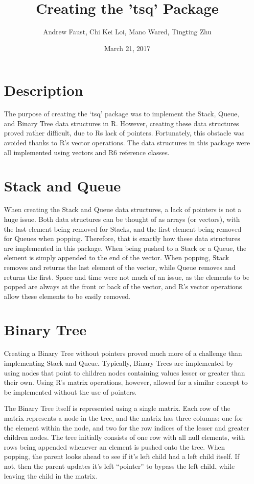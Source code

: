 \documentclass[12pt,letterpaper]{article}
\begin{document}
\title{Creating the 'tsq' Package}
\date{March 21, 2017}
\author{Andrew Faust, Chi Kei Loi, Mano Wared, Tingting Zhu}
\maketitle

\section{Description}
The purpose of creating the ‘tsq’ package was to implement the Stack, Queue,
and Binary Tree data structures in R. However, creating these data structures
proved rather difficult, due to Rs lack of pointers. Fortunately, this obstacle
was avoided thanks to R’s vector operations. The data structures in this
package were all implemented using vectors and R6 reference classes.

\section{Stack and Queue}
When creating the Stack and Queue data structures, a lack of pointers is not a
huge issue. Both data structures can be thought of as arrays (or vectors), with
the last element being removed for Stacks, and the first element being removed
for Queues when popping. Therefore, that is exactly how these data structures
are implemented in this package. When being pushed to a Stack or a Queue, the
element is simply appended to the end of the vector. When popping, Stack
removes and returns the last element of the vector, while Queue removes and
returns the first. Space and time were not much of an issue, as the elements to
be popped are always at the front or back of the vector, and R's vector
operations allow these elements to be easily removed.

\section{Binary Tree}
Creating a Binary Tree without pointers proved much more of a challenge than
implementing Stack and Queue. Typically, Binary Trees are implemented by using
nodes that point to children nodes containing values lesser or greater than
their own. Using R’s matrix operations, however, allowed for a similar concept
to be implemented without the use of pointers.

The Binary Tree itself is represented using a single matrix. Each row of the
matrix represents a node in the tree, and the matrix has three columns: one for
the element within the node, and two for the row indices of the lesser and
greater children nodes. The tree initially consists of one row with all null
elements, with rows being appended whenever an element is pushed onto the tree.
When popping, the parent looks ahead to see if it’s left child had a left
child itself. If not, then the parent updates it’s left “pointer” to
bypass the left child, while leaving the child in the matrix.
\end{document}
